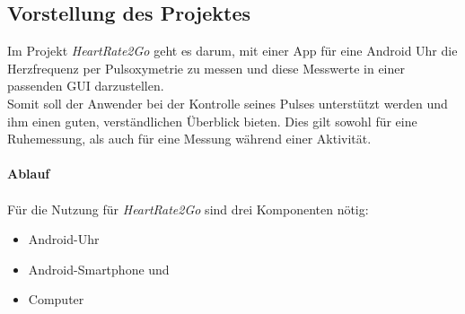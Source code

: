 \subsection{Vorstellung des Projektes} \label{sec:Vorstellung des Projektes}
Im Projekt \textit{HeartRate2Go} geht es darum, mit einer App für eine Android Uhr die Herzfrequenz per Pulsoxymetrie zu messen und diese Messwerte in einer passenden GUI darzustellen. \\
Somit soll der Anwender bei der Kontrolle seines Pulses unterstützt werden und ihm einen guten, verständlichen Überblick bieten. Dies gilt sowohl für eine Ruhemessung, als auch für eine Messung während einer Aktivität. \\
\\
\textbf{Ablauf}\\
\\
Für die Nutzung für \textit{HeartRate2Go} sind drei Komponenten nötig:\\
\begin{itemize}
	\item Android-Uhr
	\item Android-Smartphone und
	\item Computer
\end{itemize}

